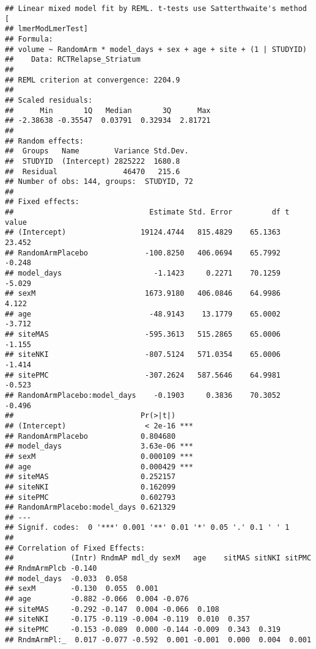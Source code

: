 \documentclass[]{article}
\theoremstyle{definition}
\theoremstyle{definition}
\theoremstyle{definition}
\theoremstyle{remark}
\begin{document}
\begin{verbatim}
## Linear mixed model fit by REML. t-tests use Satterthwaite's method [
## lmerModLmerTest]
## Formula: 
## volume ~ RandomArm * model_days + sex + age + site + (1 | STUDYID)
##    Data: RCTRelapse_Striatum
## 
## REML criterion at convergence: 2204.9
## 
## Scaled residuals: 
##      Min       1Q   Median       3Q      Max 
## -2.38638 -0.35547  0.03791  0.32934  2.81721 
## 
## Random effects:
##  Groups   Name        Variance Std.Dev.
##  STUDYID  (Intercept) 2825222  1680.8  
##  Residual               46470   215.6  
## Number of obs: 144, groups:  STUDYID, 72
## 
## Fixed effects:
##                               Estimate Std. Error         df t value
## (Intercept)                 19124.4744   815.4829    65.1363  23.452
## RandomArmPlacebo             -100.8250   406.0694    65.7992  -0.248
## model_days                     -1.1423     0.2271    70.1259  -5.029
## sexM                         1673.9180   406.0846    64.9986   4.122
## age                           -48.9143    13.1779    65.0002  -3.712
## siteMAS                      -595.3613   515.2865    65.0006  -1.155
## siteNKI                      -807.5124   571.0354    65.0006  -1.414
## sitePMC                      -307.2624   587.5646    64.9981  -0.523
## RandomArmPlacebo:model_days    -0.1903     0.3836    70.3052  -0.496
##                             Pr(>|t|)    
## (Intercept)                  < 2e-16 ***
## RandomArmPlacebo            0.804680    
## model_days                  3.63e-06 ***
## sexM                        0.000109 ***
## age                         0.000429 ***
## siteMAS                     0.252157    
## siteNKI                     0.162099    
## sitePMC                     0.602793    
## RandomArmPlacebo:model_days 0.621329    
## ---
## Signif. codes:  0 '***' 0.001 '**' 0.01 '*' 0.05 '.' 0.1 ' ' 1
## 
## Correlation of Fixed Effects:
##             (Intr) RndmAP mdl_dy sexM   age    sitMAS sitNKI sitPMC
## RndmArmPlcb -0.140                                                 
## model_days  -0.033  0.058                                          
## sexM        -0.130  0.055  0.001                                   
## age         -0.882 -0.066  0.004 -0.076                            
## siteMAS     -0.292 -0.147  0.004 -0.066  0.108                     
## siteNKI     -0.175 -0.119 -0.004 -0.119  0.010  0.357              
## sitePMC     -0.153 -0.089  0.000 -0.144 -0.009  0.343  0.319       
## RndmArmPl:_  0.017 -0.077 -0.592  0.001 -0.001  0.000  0.004  0.001
\end{verbatim}
\end{document}
